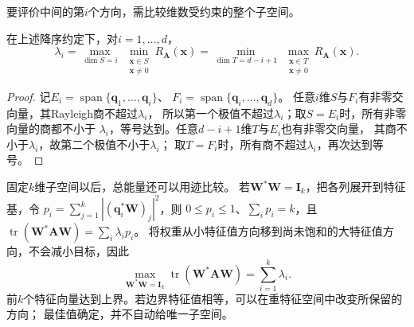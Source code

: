 要评价中间的第$i$个方向，需比较维数受约束的整个子空间。
\begin{theorem}
\label{thm:matrix-analysis-courant-fischer}
在上述降序约定下，对$i=1,\ldots,d$，
\begin{equation}
 \lambda_i
 =\max_{\dim S=i}\ \min_{\substack{\bm x\in S\\\bm x\neq0}}R_{\bm A}(\bm x)
 =\min_{\dim T=d-i+1}\ \max_{\substack{\bm x\in T\\\bm x\neq0}}R_{\bm A}(\bm x).
 \label{eq:matrix-analysis-courant-fischer}
\end{equation}
\end{theorem}
\begin{proof}
记$E_i=\operatorname{span}\{\bm q_1,\ldots,\bm q_i\}$、
$F_i=\operatorname{span}\{\bm q_i,\ldots,\bm q_d\}$。
任意$i$维$S$与$F_i$有非零交向量，其Rayleigh商不超过$\lambda_i$，
所以第一个极值不超过$\lambda_i$；取$S=E_i$时，所有非零向量的商都不小于
$\lambda_i$，等号达到。任意$d-i+1$维$T$与$E_i$也有非零交向量，
其商不小于$\lambda_i$，故第二个极值不小于$\lambda_i$；
取$T=F_i$时，所有商不超过$\lambda_i$，再次达到等号。
\end{proof}

固定$k$维子空间以后，总能量还可以用迹比较。
若$\bm W^*\bm W=\bm I_k$，把各列展开到特征基，令
$p_i=\sum_{j=1}^k|(\bm q_i^*\bm W)_j|^2$，则
$0\leq p_i\leq1$、$\sum_i p_i=k$，且
$\operatorname{tr}(\bm W^*\bm A\bm W)=\sum_i\lambda_i p_i$。
将权重从小特征值方向移到尚未饱和的大特征值方向，不会减小目标，因此
\[
 \max_{\bm W^*\bm W=\bm I_k}\operatorname{tr}(\bm W^*\bm A\bm W)
 =\sum_{i=1}^k\lambda_i.
\]
前$k$个特征向量达到上界。若边界特征值相等，可以在重特征空间中改变所保留的方向；
最佳值确定，并不自动给唯一子空间。

